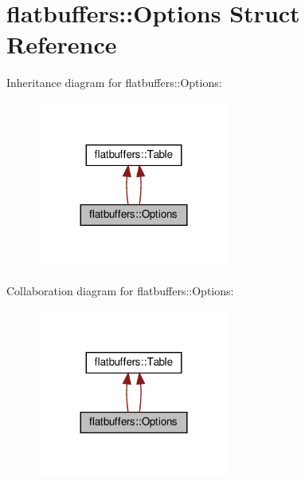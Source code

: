 \hypertarget{structflatbuffers_1_1Options}{}\section{flatbuffers\+:\+:Options Struct Reference}
\label{structflatbuffers_1_1Options}


Inheritance diagram for flatbuffers\+:\+:Options\+:
\nopagebreak
\begin{figure}[H]
\begin{center}
\leavevmode
\includegraphics[width=180pt]{structflatbuffers_1_1Options__inherit__graph}
\end{center}
\end{figure}


Collaboration diagram for flatbuffers\+:\+:Options\+:
\nopagebreak
\begin{figure}[H]
\begin{center}
\leavevmode
\includegraphics[width=180pt]{structflatbuffers_1_1Options__coll__graph}
\end{center}
\end{figure}
